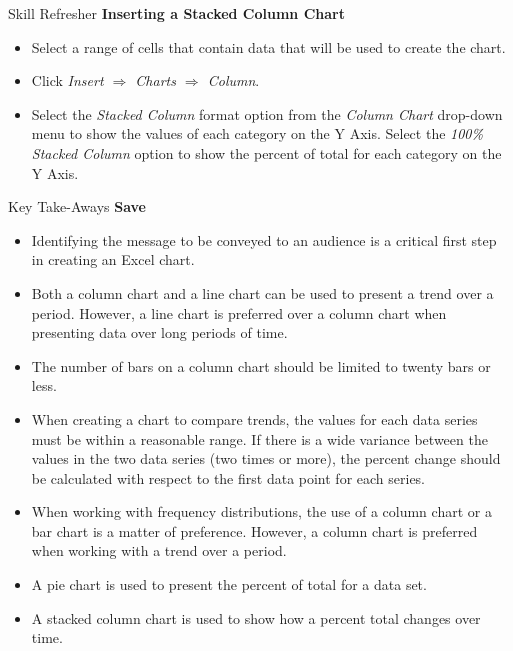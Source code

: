 \begin{center}
	\begin{sklbox}{Skill Refresher}
		\textbf{Inserting a Stacked Column Chart}
		\\
		\begin{itemize}
			\setlength{\itemsep}{0pt}
			\setlength{\parskip}{0pt}
			\setlength{\parsep}{0pt}

			\item Select a range of cells that contain data that will be used to create the chart.
			\item Click \textit{Insert $ \Rightarrow $ Charts $ \Rightarrow $ Column}.
			\item Select the \textit{Stacked Column} format option from the \textit{Column Chart} drop-down menu to show the values of each category on the Y Axis. Select the \textit{100\% Stacked Column} option to show the percent of total for each category on the Y Axis.
			
		\end{itemize}
	\end{sklbox}
\end{center}

\begin{center}
	\begin{tkwbox}{Key Take-Aways}
		\textbf{Save}
		\\
		\begin{itemize}
			\setlength{\itemsep}{0pt}
			\setlength{\parskip}{0pt}
			\setlength{\parsep}{0pt}
			
			\item Identifying the message to be conveyed to an audience is a critical first step in creating an Excel chart.
			\item Both a column chart and a line chart can be used to present a trend over a period. However, a line chart is preferred over a column chart when presenting data over long periods of time.
			\item The number of bars on a column chart should be limited to twenty bars or less.
			\item When creating a chart to compare trends, the values for each data series must be within a reasonable range. If there is a wide variance between the values in the two data series (two times or more), the percent change should be calculated with respect to the first data point for each series.
			\item When working with frequency distributions, the use of a column chart or a bar chart is a matter of preference. However, a column chart is preferred when working with a trend over a period.
			\item A pie chart is used to present the percent of total for a data set.
			\item A stacked column chart is used to show how a percent total changes over time.

		\end{itemize}
	\end{tkwbox}
\end{center}

